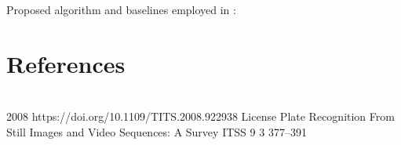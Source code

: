 Proposed algorithm and baselines employed in : 

\section*{References}

\begin{publications}
  \\

  {
  }
  {2008}
  {https://doi.org/10.1109/TITS.2008.922938}
  {License Plate Recognition From Still Images and Video Sequences: A Survey}
  {ITSS}
  {9}
  {3}
  {377--391}
  {}
  \\

\end{publications}




